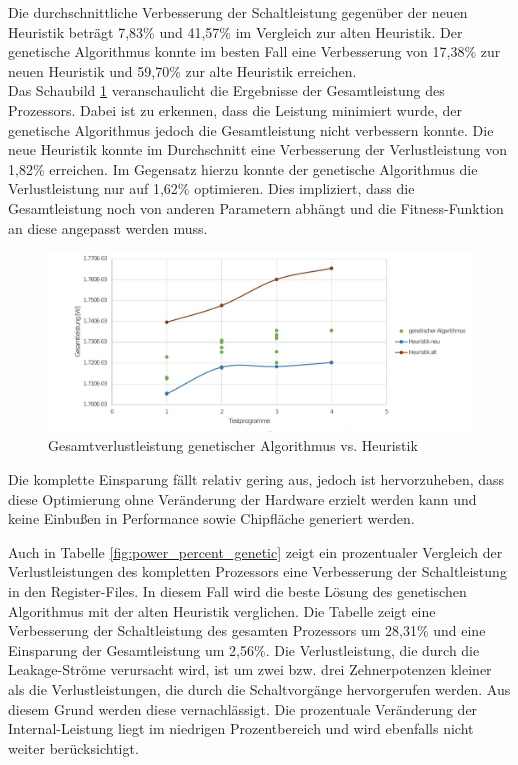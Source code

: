 Die durchschnittliche Verbesserung der Schaltleistung gegenüber der neuen Heuristik beträgt 7,83\% und 41,57\% im Vergleich zur alten Heuristik. Der genetische Algorithmus konnte im besten Fall eine Verbesserung von 17,38\% zur neuen Heuristik und 59,70\% zur alte Heuristik erreichen.\\
Das Schaubild \ref{fig:eval_genetic_total_power} veranschaulicht die Ergebnisse der Gesamtleistung des Prozessors. Dabei ist zu erkennen, dass die Leistung minimiert wurde, der genetische Algorithmus jedoch die Gesamtleistung nicht verbessern konnte. Die neue Heuristik konnte im Durchschnitt eine Verbesserung der Verlustleistung von 1,82\% erreichen. Im Gegensatz hierzu konnte der genetische Algorithmus die Verlustleistung nur auf 1,62\% optimieren. Dies impliziert, dass die Gesamtleistung noch von anderen Parametern abhängt und die Fitness-Funktion an diese angepasst werden muss.

\begin{figure}[H]
	\centering
	\includegraphics[width=\textwidth]{fig/gesamtleistung_genetik_heuristik.pdf}
	\caption{Gesamtverlustleistung genetischer Algorithmus vs. Heuristik}
	\label{fig:eval_genetic_total_power}
\end{figure}

Die komplette Einsparung fällt relativ gering aus, jedoch ist hervorzuheben, dass diese Optimierung ohne Veränderung der Hardware erzielt werden kann und keine Einbußen in Performance sowie Chipfläche generiert werden.
%

Auch in Tabelle \ref{fig:power_percent_genetic} zeigt ein prozentualer Vergleich der Verlustleistungen des kompletten Prozessors eine Verbesserung der Schaltleistung in den Register-Files. In diesem Fall wird die beste Lösung des genetischen Algorithmus mit der alten Heuristik verglichen. Die Tabelle zeigt eine Verbesserung der Schaltleistung des gesamten Prozessors um 28,31\% und eine Einsparung der Gesamtleistung um 2,56\%. Die Verlustleistung, die durch die Leakage-Ströme verursacht wird, ist um zwei bzw. drei Zehnerpotenzen kleiner als die Verlustleistungen, die durch die Schaltvorgänge hervorgerufen werden. Aus diesem Grund werden diese vernachlässigt. 
Die prozentuale Veränderung der Internal-Leistung liegt im niedrigen Prozentbereich und wird ebenfalls nicht weiter berücksichtigt. 

